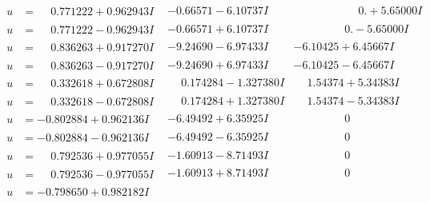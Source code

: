 \documentclass[1p]{elsarticle_modified}
\theoremstyle{definition}
\begin{document}
$$\begin{array}{c|c|c}
 \hline 
\begin{aligned}
u &= \phantom{-}0.771222 + 0.962943 I\end{aligned}
 & -0.66571 - 6.10737 I & \phantom{-0.000000 -}0. + 5.65000 I \\ \hline\begin{aligned}
u &= \phantom{-}0.771222 - 0.962943 I\end{aligned}
 & -0.66571 + 6.10737 I & \phantom{-0.000000 } 0. - 5.65000 I \\ \hline\begin{aligned}
u &= \phantom{-}0.836263 + 0.917270 I\end{aligned}
 & -9.24690 - 6.97433 I & -6.10425 + 6.45667 I \\ \hline\begin{aligned}
u &= \phantom{-}0.836263 - 0.917270 I\end{aligned}
 & -9.24690 + 6.97433 I & -6.10425 - 6.45667 I \\ \hline\begin{aligned}
u &= \phantom{-}0.332618 + 0.672808 I\end{aligned}
 & \phantom{-}0.174284 - 1.327380 I & \phantom{-}1.54374 + 5.34383 I \\ \hline\begin{aligned}
u &= \phantom{-}0.332618 - 0.672808 I\end{aligned}
 & \phantom{-}0.174284 + 1.327380 I & \phantom{-}1.54374 - 5.34383 I \\ \hline\begin{aligned}
u &= -0.802884 + 0.962136 I\end{aligned}
 & -6.49492 + 6.35925 I & \phantom{-0.000000 } 0 \\ \hline\begin{aligned}
u &= -0.802884 - 0.962136 I\end{aligned}
 & -6.49492 - 6.35925 I & \phantom{-0.000000 } 0 \\ \hline\begin{aligned}
u &= \phantom{-}0.792536 + 0.977055 I\end{aligned}
 & -1.60913 - 8.71493 I & \phantom{-0.000000 } 0 \\ \hline\begin{aligned}
u &= \phantom{-}0.792536 - 0.977055 I\end{aligned}
 & -1.60913 + 8.71493 I & \phantom{-0.000000 } 0 \\ \hline\begin{aligned}
u &= -0.798650 + 0.982182 I\end{aligned}

\end{array}$$
\end{document}

